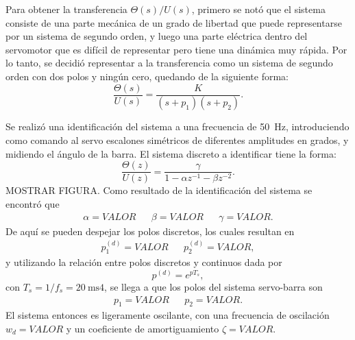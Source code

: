 Para obtener la transferencia $\Theta(s) / U(s)$, primero se notó que el sistema consiste de una parte mecánica de un grado de libertad que puede representarse por un sistema de segundo orden, y luego una parte eléctrica dentro del servomotor que es difícil de representar pero tiene una dinámica muy rápida. Por lo tanto, se decidió representar a la transferencia como un sistema de segundo orden con dos polos y ningún cero, quedando de la siguiente forma:
\[
    \frac{\Theta(s)}{U(s)} = \frac{K}{(s+p_1)(s+p_2)}.
\]

Se realizó una identificación del sistema a una frecuencia de \qty{50}{\Hz}, introduciendo como comando al servo escalones simétricos de diferentes amplitudes en grados, y midiendo el ángulo de la barra. El sistema discreto a identificar tiene la forma:
\[
    \frac{\Theta(z)}{U(z)} = \frac{\gamma}{1 - \alpha z^{-1} - \beta z^{-2}}.
\]
MOSTRAR FIGURA. Como resultado de la identificación del sistema se encontró que
\begin{align*}
    \alpha = VALOR && \beta = VALOR && \gamma = VALOR.
\end{align*}
De aquí se pueden despejar los polos discretos, los cuales resultan en
\begin{align*}
    p_1^{(d)} = VALOR && p_2^{(d)} = VALOR,
\end{align*}
y utilizando la relación entre polos discretos y continuos dada por
\[
    p^{(d)} = e^{p T_s},
\]
con $T_s = 1/f_s = \qty{20}{\ms}4$, se llega a que los polos del sistema servo-barra son
\begin{align*}
    p_1 = VALOR && p_2 = VALOR.
\end{align*}
El sistema entonces es ligeramente oscilante, con una frecuencia de oscilación $w_d = VALOR$ y un coeficiente de amortiguamiento $\zeta = VALOR$.

